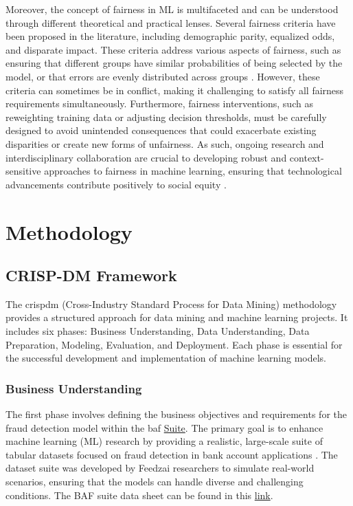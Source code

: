\documentclass[12pt,a4paper]{report}
\begin{document}
Moreover, the concept of fairness in ML is multifaceted and can be understood through different theoretical and practical lenses. Several fairness criteria have been proposed in the literature, including demographic parity, equalized odds, and disparate impact. These criteria address various aspects of fairness, such as ensuring that different groups have similar probabilities of being selected by the model, or that errors are evenly distributed across groups \citep{barocas2023fairness}. However, these criteria can sometimes be in conflict, making it challenging to satisfy all fairness requirements simultaneously. Furthermore, fairness interventions, such as reweighting training data or adjusting decision thresholds, must be carefully designed to avoid unintended consequences that could exacerbate existing disparities or create new forms of unfairness. As such, ongoing research and interdisciplinary collaboration are crucial to developing robust and context-sensitive approaches to fairness in machine learning, ensuring that technological advancements contribute positively to social equity \citep{barocas2023fairness}.










\chapter{Methodology}

\section{CRISP-DM Framework}
The \acrshort{crispdm} (Cross-Industry Standard Process for Data Mining) methodology provides a structured approach for data mining and machine learning projects. It includes six phases: Business Understanding, Data Understanding, Data Preparation, Modeling, Evaluation, and Deployment. Each phase is essential for the successful development and implementation of machine learning models.\\

\subsection{Business Understanding}
The first phase involves defining the business objectives and requirements for the fraud detection model within the \acrshort{baf} \href{https://www.kaggle.com/datasets/sgpjesus/bank-account-fraud-dataset-neurips-2022/code}{Suite}. The primary goal is to enhance machine learning (ML) research by providing a realistic, large-scale suite of tabular datasets focused on fraud detection in bank account applications \citep{jesus2022turning}. The dataset suite was developed by Feedzai researchers to simulate real-world scenarios, ensuring that the models can handle diverse and challenging conditions. The BAF suite data sheet can be found in this  \href{https://github.com/feedzai/bank-account-fraud/blob/main/documents/datasheet.pdf}{link}.\\
\end{document}
